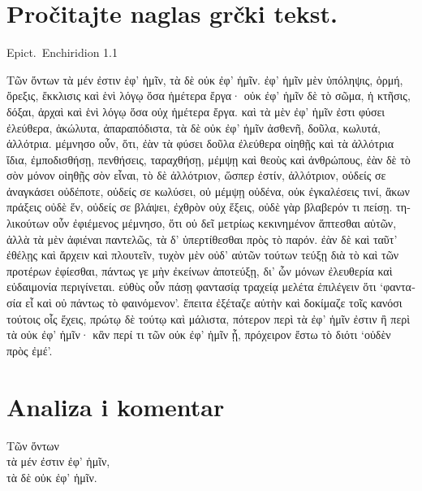 \section*{Pročitajte naglas grčki tekst.}

Epict.\ Enchiridion 1.1


\medskip

\begin{greek}
{\large
{ \noindent Τῶν ὄντων τὰ μέν ἐστιν ἐφ' ἡμῖν, τὰ δὲ οὐκ ἐφ' ἡμῖν. ἐφ' ἡμῖν μὲν ὑπόληψις, ὁρμή, ὄρεξις, ἔκκλισις καὶ ἑνὶ λόγῳ ὅσα ἡμέτερα ἔργα· οὐκ ἐφ' ἡμῖν δὲ τὸ σῶμα, ἡ κτῆσις, δόξαι, ἀρχαὶ καὶ ἑνὶ λόγῳ ὅσα οὐχ ἡμέτερα ἔργα. καὶ τὰ μὲν ἐφ' ἡμῖν ἐστι φύσει ἐλεύθερα, ἀκώλυτα, ἀπαραπόδιστα, τὰ δὲ οὐκ ἐφ' ἡμῖν ἀσθενῆ, δοῦλα, κωλυτά, ἀλλότρια. μέμνησο οὖν, ὅτι, ἐὰν τὰ φύσει δοῦλα ἐλεύθερα οἰηθῇς καὶ τὰ ἀλλότρια ἴδια, ἐμποδισθήσῃ, πενθήσεις, ταραχθήσῃ, μέμψῃ καὶ θεοὺς καὶ ἀνθρώπους, ἐὰν δὲ τὸ σὸν μόνον οἰηθῇς σὸν εἶναι, τὸ δὲ ἀλλότριον, ὥσπερ ἐστίν, ἀλλότριον, οὐδείς σε ἀναγκάσει οὐδέποτε, οὐδείς σε κωλύσει, οὐ μέμψῃ οὐδένα, οὐκ ἐγκαλέσεις τινί, ἄκων πράξεις οὐδὲ ἕν, οὐδείς σε βλάψει, ἐχθρὸν οὐχ ἕξεις, οὐδὲ γὰρ βλαβερόν τι πείσῃ. τηλικούτων οὖν ἐφιέμενος μέμνησο, ὅτι οὐ δεῖ μετρίως  κεκινημένον ἅπτεσθαι αὐτῶν, ἀλλὰ τὰ μὲν ἀφιέναι παντελῶς, τὰ δ' ὑπερτίθεσθαι πρὸς τὸ παρόν. ἐὰν δὲ καὶ ταῦτ' ἐθέλῃς καὶ ἄρχειν καὶ πλουτεῖν, τυχὸν μὲν οὐδ' αὐτῶν τούτων τεύξῃ διὰ τὸ καὶ τῶν προτέρων ἐφίεσθαι, πάντως γε μὴν ἐκείνων ἀποτεύξῃ, δι' ὧν μόνων ἐλευθερία καὶ εὐδαιμονία περιγίνεται. εὐθὺς οὖν πάσῃ φαντασίᾳ τραχείᾳ μελέτα ἐπιλέγειν ὅτι ‘φαντασία εἶ καὶ οὐ πάντως τὸ φαινόμενον’. ἔπειτα ἐξέταζε αὐτὴν καὶ δοκίμαζε τοῖς κανόσι τούτοις οἷς ἔχεις, πρώτῳ δὲ τούτῳ καὶ μάλιστα, πότερον περὶ τὰ ἐφ' ἡμῖν ἐστιν ἢ περὶ τὰ οὐκ ἐφ' ἡμῖν· κἂν περί τι τῶν οὐκ ἐφ' ἡμῖν ᾖ, πρόχειρον ἔστω τὸ διότι ‘οὐδὲν πρὸς ἐμέ’.

}
}
\end{greek}

\vfill

\newpage

\section*{Analiza i komentar}


{\large
\begin{greek}
\noindent Τῶν ὄντων \\
\tabto{2em} τὰ μέν ἐστιν ἐφ' ἡμῖν, \\
\tabto{2em} τὰ δὲ οὐκ ἐφ' ἡμῖν. \\

\end{greek}
}

